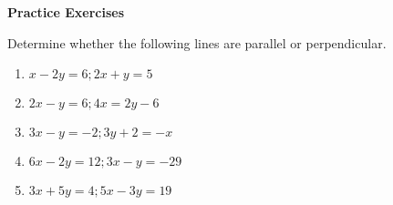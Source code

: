 \textbf{Practice Exercises}

\vspce

Determine whether the following lines are parallel or perpendicular.  

\begin{enumerate}[label = \arabic*. ]
\item \hspce $x-2y=6; 2x+y=5$
\vspce 
\item \hspce $2x-y=6; 4x=2y-6$
\vspce 
\item \hspce $3x-y=-2; 3y+2=-x$
\vspce 
\item \hspce $6x-2y=12; 3x-y=-29$
\vspce 
\item \hspce $3x+5y=4; 5x-3y=19$
\end{enumerate}  
